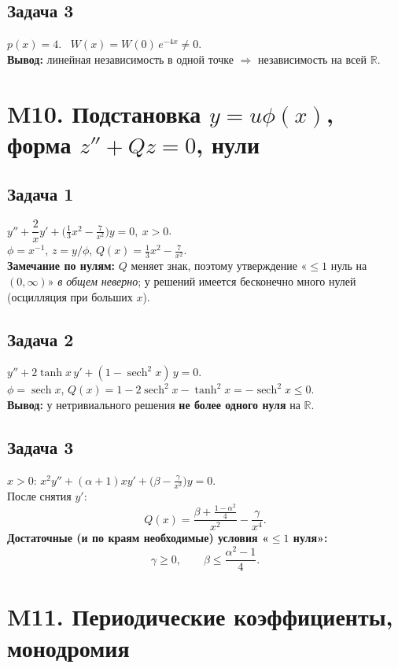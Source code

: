 \documentclass[12pt]{article}
\begin{document}
\subsection*{Задача 3}
$p(x)=4$. \ $W(x)=W(0)\,e^{-4x}\neq0$. \\
\textbf{Вывод: } линейная независимость в одной точке $\Rightarrow$ независимость на всей $\mathbb{R}$.

\section*{M10. Подстановка $y=u\phi(x)$, форма $z''+Qz=0$, нули}

\subsection*{Задача 1}
$y''+\dfrac{2}{x}y'+\bigl(\tfrac13 x^2-\tfrac{7}{x^2}\bigr)y=0,\ x>0$. \\
$\phi=x^{-1}$, $z=y/\phi$, $Q(x)=\tfrac13 x^2-\tfrac{7}{x^2}$. \\
\textbf{Замечание по нулям: } $Q$ меняет знак, поэтому утверждение «$\le1$ нуль на $(0,\infty)$» \emph{в общем неверно}; у решений имеется бесконечно много нулей (осцилляция при больших $x$).

\subsection*{Задача 2}
$y''+2\tanh x\,y'+(1-\operatorname{sech}^2 x)\,y=0$. \\
$\phi=\operatorname{sech}x$, $Q(x)=1-2\operatorname{sech}^2x-\tanh^2x=-\operatorname{sech}^2x\le0$. \\
\textbf{Вывод: } у нетривиального решения \textbf{не более одного нуля} на $\mathbb{R}$.

\subsection*{Задача 3}
$x>0$: $x^2y''+(\alpha+1)xy'+\bigl(\beta-\frac{\gamma}{x^2}\bigr)y=0$. \\
После снятия $y'$:
\[
Q(x)=\frac{\beta+\frac{1-\alpha^2}{4}}{x^2}-\frac{\gamma}{x^4}.
\]
\textbf{Достаточные (и по краям необходимые) условия «$\le1$ нуля»: } 
\[
\gamma\ge0,\qquad \beta\le\frac{\alpha^2-1}{4}.
\]

\section*{M11. Периодические коэффициенты, монодромия}
\end{document}

